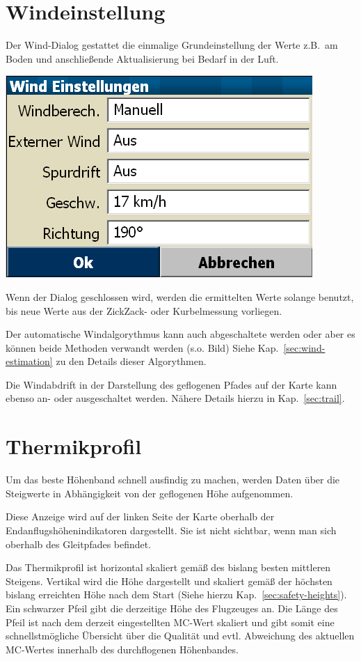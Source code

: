 \section{Windeinstellung}
Der Wind-Dialog gestattet die einmalige Grundeinstellung der Werte  z.B.\ am Boden und
anschließende Aktualisierung bei Bedarf in der Luft.
\begin{center}
\includegraphics[angle=0,width=0.75\linewidth,keepaspectratio='true']{figures/dialog-wind2.png}
\end{center}
Wenn der Dialog geschlossen wird, werden die ermittelten Werte solange benutzt,
bis neue Werte aus der ZickZack- oder Kurbelmessung vorliegen.

Der automatische Windalgorythmus kann auch abgeschaltete werden oder aber es können
beide Methoden verwandt werden (s.o. Bild) Siehe Kap.~\ref{sec:wind-estimation}
zu den Details dieser Algorythmen.

Die Windabdrift in der Darstellung des geflogenen Pfades  auf der Karte kann ebenso an-
oder ausgeschaltet werden. Nähere Details hierzu in Kap.~\ref{sec:trail}.
\section{Thermikprofil}
Um das beste Höhenband schnell ausfindig zu machen, werden Daten über die Steigwerte in
Abhängigkeit von der geflogenen Höhe aufgenommen.

Diese Anzeige wird auf der linken Seite der Karte oberhalb der Endanflugshöhenindikatoren dargestellt.
Sie ist nicht sichtbar, wenn man sich oberhalb des Gleitpfades befindet.


Das Thermikprofil ist horizontal skaliert gemäß des bislang besten mittleren Steigens.
Vertikal wird die Höhe dargestellt und skaliert gemäß der höchsten bislang erreichten Höhe nach dem Start
(Siehe hierzu Kap.~\ref{sec:safety-heights}). Ein schwarzer Pfeil gibt die derzeitige Höhe des Flugzeuges an.
Die Länge des  Pfeil ist nach dem derzeit eingestellten MC-Wert skaliert und gibt somit eine schnellstmögliche
Übersicht über die Qualität und evtl. Abweichung des aktuellen MC-Wertes innerhalb des durchflogenen Höhenbandes.

